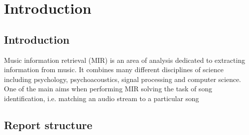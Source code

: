 
\chapter{Introduction}
\label{chap:introduction}
\ifpdf
    \graphicspath{{Introduction/Figures/PNG/}{Introduction/Figures/PDF/}{Introduction/Figures/}}
\else
    \graphicspath{{Introduction/Figures/EPS/}{Introduction/Figures/}}
\fi




  

\section{Introduction}
\label{introduction}

Music information retrieval (MIR) is an area of analysis dedicated to extracting information from music. It combines many different disciplines of science including psychology, psychoacoustics, signal processing and computer science. One of the main aims when performing MIR solving the task of song identification, i.e. matching an audio stream to a particular song \nocite{weinstein2007music}


\section{Report structure}
\label{structure}
